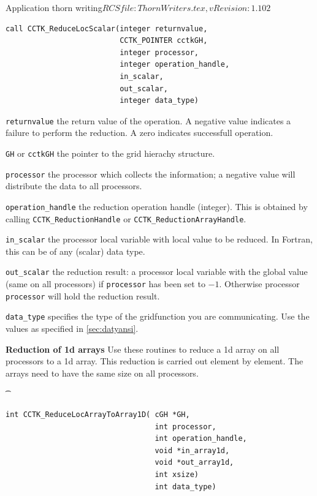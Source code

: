 \begin{cactuspart}{2}{Application thorn writing}{$RCSfile: ThornWriters.tex,v $}{$Revision: 1.102 $}
{\begin{verbatim}
call CCTK_ReduceLocScalar(integer returnvalue,
                          CCTK_POINTER cctkGH,
                          integer processor,
                          integer operation_handle,
                          in_scalar,
                          out_scalar,
                          integer data_type)
\end{verbatim}
}
\begin{Lentry}
\item[{\tt returnvalue}] the return value of the operation.  A
negative value indicates a failure to perform the reduction.  A zero
indicates successfull operation.
\item[{\tt GH} or {\tt cctkGH}] the pointer to the grid hierachy
structure.
\item[{\tt processor}] the processor which collects the
information; a negative value will distribute the data to all
processors.
\item[{\tt operation\_handle}] the reduction operation handle
(integer).  This is obtained by calling {\tt CCTK\_ReductionHandle} or
{\tt CCTK\_ReductionArrayHandle}.

\item[{\tt in\_scalar}] the processor local variable with local value
to be reduced.  In Fortran, this can be of any (scalar) data type.

\item[{\tt out\_scalar}] the reduction result: a processor local variable
with the global value (same on all processors) if {\tt processor} has been
set to $-1$.  Otherwise processor {\tt processor} will hold the reduction result.

\item[{\tt data\_type}] specifies the type of the gridfunction you are
communicating. Use the values as specified in \ref{sec:datyansi}.
\end{Lentry}

\vskip 0.24cm
{\bf Reduction of 1d arrays}  Use these routines to
reduce a 1d array on all processors to a 1d array.  This reduction is carried
out element by element. The arrays need to have the same size on all
processors.
{\t
\begin{verbatim}
int CCTK_ReduceLocArrayToArray1D( cGH *GH,
                                  int processor,
                                  int operation_handle,
                                  void *in_array1d,
                                  void *out_array1d,
                                  int xsize)
                                  int data_type)


\end{verbatim}}
\end{cactuspart}

